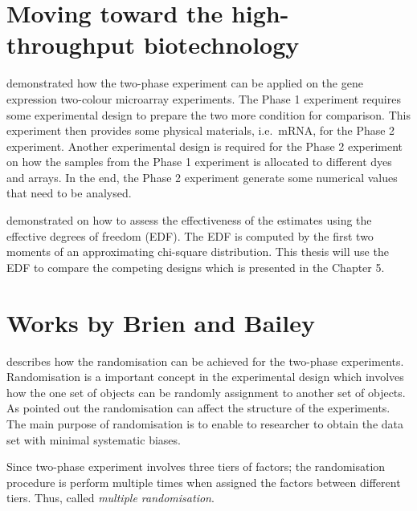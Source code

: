 \documentclass[11pt,a4paper]{article}
\begin{document}
\section{Moving toward the high-throughput biotechnology}
\cite{Jarrett2008} demonstrated how the two-phase experiment can be applied on the gene expression two-colour microarray experiments. The Phase 1 experiment requires some experimental design to prepare the two more condition for comparison. This experiment then provides some physical materials, i.e.\ mRNA, for the Phase 2 experiment. Another experimental design is required for the Phase 2 experiment on how the samples from the Phase 1 experiment is allocated to different dyes and arrays. In the end, the Phase 2 experiment generate some numerical values that need to be analysed. 

\cite{Jarrett2008} demonstrated on how to assess the effectiveness of the estimates using the effective degrees of freedom (EDF). The EDF is computed by the first two moments of an approximating chi-square distribution. This thesis will use the EDF to compare the competing designs which is presented in the Chapter 5.



\section{Works by Brien and Bailey} 
\cite{Brien2006b} describes how the randomisation can be achieved for the two-phase experiments. Randomisation is a important concept in the experimental design which involves how the one set of objects can be randomly assignment to another set of objects. As \cite{Brien1983} pointed out the randomisation can affect the structure of the experiments. The main purpose of randomisation is to enable to researcher to obtain the data set with minimal systematic biases. 

Since two-phase experiment involves three tiers of factors; the randomisation procedure is perform multiple times when assigned the factors between different tiers. Thus, \cite{Brien2006b} called \emph{multiple randomisation}. 
\end{document}

